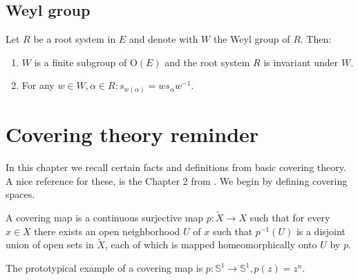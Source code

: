 \documentclass{report}
\begin{document}
\section{Weyl group}
\begin{lemma}
    Let $R$ be a root system in $E$ and denote with $W$ the Weyl group of $R$. Then:
    \begin{enumerate}[label = (\roman*)]
        \item $W$ is a finite subgroup of $\mathrm{O}(E)$ and the root system $R$ is invariant under $W$.
        \item For any $w\in W, \alpha \in R: s_{w(\alpha)}=w s_\alpha w^{-1}$.
    \end{enumerate}
\end{lemma}
\appendix

\chapter{Covering theory reminder}
In this chapter we recall certain facts and definitions from basic covering theory.
A nice reference for these, is the Chapter 2 from \cite{hatcher2002topology}.
We begin by defining covering spaces.
\begin{definition}
    A covering map is a continuous surjective map $p: \tilde X \to X$ such that for every $x \in X$ there exists an open neighborhood $U$ of $x$ such that $p^{-1}(U)$ is a disjoint union of open sets in $\tilde X$, each of which is mapped homeomorphically onto $U$ by $p$.
\end{definition}
The prototypical example of a covering map is $p: \mathbb S^1 \to \mathbb S^1, p(z) = z^n$.
\end{document}
